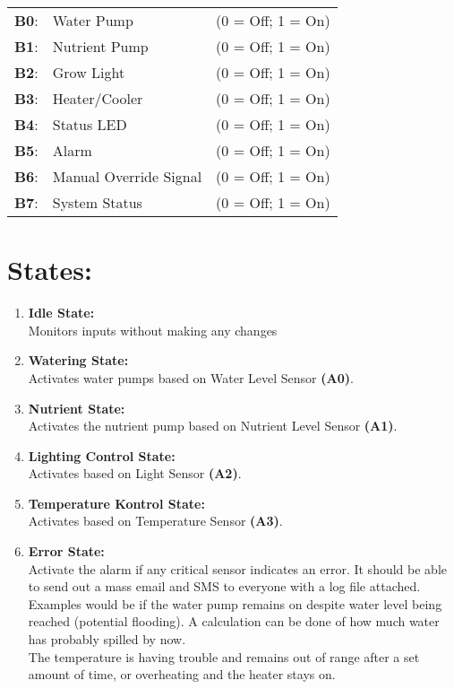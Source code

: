 \documentclass[12pt]{article}
\begin{document}
\begin{tabular}{ l l l }

   \textbf{B0}: & Water Pump & \quad (0 = Off; 1 = On) \\
   \textbf{B1}: & Nutrient Pump & \quad (0 = Off; 1 = On) \\
   \textbf{B2}: & Grow Light & \quad (0 = Off; 1 = On) \\
   \textbf{B3}: & Heater/Cooler & \quad (0 = Off; 1 = On) \\
   \textbf{B4}: & Status LED & \quad (0 = Off; 1 = On) \\
   \textbf{B5}: & Alarm & \quad (0 = Off; 1 = On) \\
   \textbf{B6}: & Manual Override Signal & \quad (0 = Off; 1 = On) \\
   \textbf{B7}: & System Status & \quad (0 = Off; 1 = On) \\
\end{tabular}

\pagebreak
\section{States:}

\begin{enumerate}
  \item\textbf{Idle State:}\\
    Monitors inputs without making any changes
  \item\textbf{Watering State:}\\
    Activates water pumps based on Water Level Sensor \textbf{(A0)}.
  \item\textbf{Nutrient State:}\\
    Activates the nutrient pump based on Nutrient Level Sensor \textbf{(A1)}.
  \item\textbf{Lighting Control State:}\\
    Activates based on Light Sensor \textbf{(A2)}.
  \item\textbf{Temperature Kontrol State:}\\
    Activates based on Temperature Sensor \textbf{(A3)}.
  \item\textbf{Error State:}\\
    Activate the alarm if any critical sensor indicates an error.
    It should be able to send out a mass email and SMS to everyone with a log file attached.\\
    Examples would be if the water pump remains on despite water level being reached (potential flooding).
    A calculation can be done of how much water has probably spilled by now.\\
   The temperature is having trouble and remains out of range after a set amount of time, or overheating and the heater stays on. 
\end{enumerate}
\end{document}
